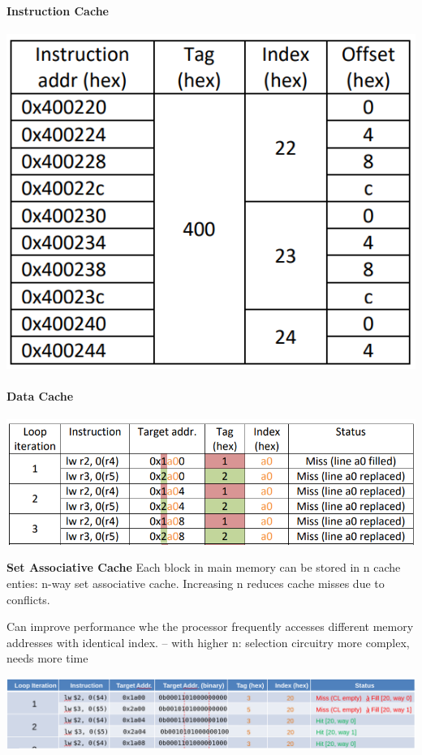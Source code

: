 \documentclass[english]{latex4ei/latex4ei_sheet}
\begin{document}
\paragraph{Instruction Cache}
\begin{center}
  \centering
  \includegraphics[width=0.6\linewidth]{assets/DirectCache2.png}
  \label{fig:directcache2}
\end{center}

\paragraph{Data Cache}
\begin{center}
  \centering
  \includegraphics[width=0.8\linewidth]{assets/DataCache.png}
  \label{fig:datacache}
\end{center}

\textbf{Set Associative Cache}
Each block in main memory can be stored in n cache enties: n-way set associative cache. Increasing n reduces cache misses due to conflicts.

Can improve performance whe the processor frequently accesses different memory addresses with identical index.
-- with higher n: selection circuitry more complex, needs more time
\begin{center}
	\includegraphics[width = \linewidth]{images/4.ProcessorArchitecture/SetAcCache.png}
\end{center}
\end{document}
